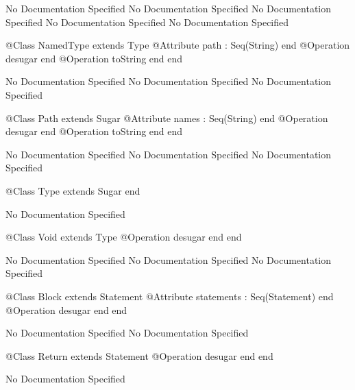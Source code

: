 No Documentation Specified
No Documentation Specified
No Documentation Specified
No Documentation Specified
No Documentation Specified
\begin{Interface}
@Class NamedType extends Type
  @Attribute path : Seq(String) end
  @Operation desugar end
  @Operation toString end
end
\end{Interface}
No Documentation Specified
No Documentation Specified
No Documentation Specified
\begin{Interface}
@Class Path extends Sugar
  @Attribute names : Seq(String) end
  @Operation desugar end
  @Operation toString end
end
\end{Interface}
No Documentation Specified
No Documentation Specified
No Documentation Specified
\begin{Interface}
@Class Type extends Sugar
end
\end{Interface}
No Documentation Specified
\begin{Interface}
@Class Void extends Type
  @Operation desugar end
end
\end{Interface}
No Documentation Specified
No Documentation Specified
No Documentation Specified
\begin{Interface}
@Class Block extends Statement
  @Attribute statements : Seq(Statement) end
  @Operation desugar end
end
\end{Interface}
No Documentation Specified
No Documentation Specified
\begin{Interface}
@Class Return extends Statement
  @Operation desugar end
end
\end{Interface}
No Documentation Specified


